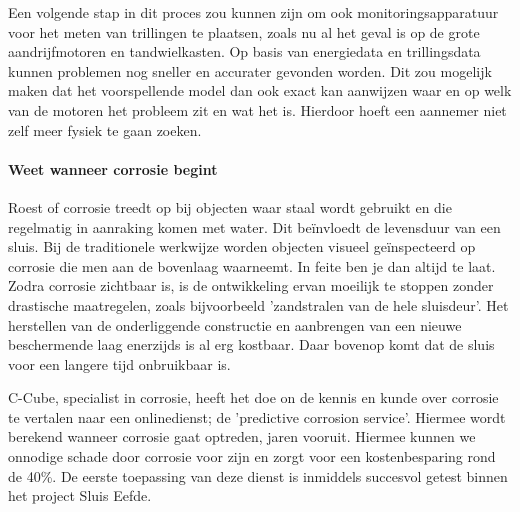 \documentclass[../literatuuronderzoek.tex]{subfiles}
\begin{document}
Een volgende stap in dit proces zou kunnen zijn om ook monitoringsapparatuur voor het meten van trillingen te plaatsen, zoals nu al het geval is op de grote aandrijfmotoren en tandwielkasten. Op basis van energiedata en trillingsdata kunnen problemen nog sneller en accurater gevonden worden. Dit zou mogelijk maken dat het voorspellende model dan ook exact kan aanwijzen waar en op welk van de motoren het probleem zit en wat het is. Hierdoor hoeft een aannemer niet zelf meer fysiek te gaan zoeken.
\cite{wcm_onderhoud}




\paragraph{Weet wanneer corrosie begint}
Roest of corrosie treedt op bij objecten waar staal wordt gebruikt en die regelmatig in aanraking komen met water. Dit beïnvloedt de levensduur van een sluis. Bij de traditionele werkwijze worden objecten visueel geïnspecteerd op corrosie die men aan de bovenlaag waarneemt.
In feite ben je dan altijd te laat. Zodra corrosie zichtbaar is, is de ontwikkeling ervan moeilijk te stoppen zonder drastische maatregelen, zoals bijvoorbeeld 'zandstralen van de hele sluisdeur'.
Het herstellen van de onderliggende constructie en aanbrengen van een nieuwe beschermende laag enerzijds is al erg kostbaar. Daar bovenop komt dat de sluis voor een langere tijd onbruikbaar is.
\cite{wcm_onderhoud}

C-Cube, specialist in corrosie, heeft het doe on de kennis en kunde over corrosie te vertalen naar een onlinedienst; de 'predictive corrosion service'. Hiermee wordt berekend wanneer corrosie gaat optreden, jaren vooruit. Hiermee kunnen we onnodige schade door corrosie voor zijn en zorgt voor een kostenbesparing rond de 40\%.
De eerste toepassing van deze dienst is inmiddels succesvol getest binnen het project Sluis Eefde.
\cite{wcm_onderhoud}
\end{document}
